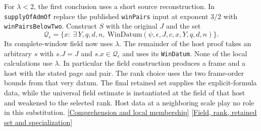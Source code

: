 \documentclass[12pt,letterpaper]{article}
\begin{document}
For \(\lambda<2\), the first conclusion uses a short source reconstruction. In \texttt{supplyOfAdmOf} replace the published \texttt{winPairs} input at exponent \(3/2\) with \texttt{winPairsBelowTwo}. Construct \(S\) with the original \(J\) and the set
\begin{equation}
 \mathcal Q_\epsilon=\{x:\ \exists\,Y,q,d,n,\ 
             \mathrm{WinDatum}(\psi,\epsilon,J,c,x,Y,q,d,n)\}.
 \label{eq:transport-qual}
\end{equation}
Its complete-window field now uses \(\lambda\). The remainder of the host proof takes an arbitrary \(s\) with \(s.J=J\) and \(s.x\in\mathcal Q_\epsilon\) and uses its \texttt{WinDatum}. None of the local calculations use \(\lambda\). In particular the field construction produces a frame and a host with the stated page and pair. The rank choice uses the two frame-order bounds from that very datum. The final retained set supplies the explicit-formula data, while the universal field estimate is instantiated at the field of that host and weakened to the selected rank. Host data at a neighboring scale play no role in this substitution.
\href{https://github.com/nousentllc/riemann-hypothesis/blob/40e56bab026552e089d7afcfeff08d2defb9c005/src/Development/AutomorphicArithmetic/ShortNorms/supplyOfAdmOf.lean#L48-L63}{[Comprehension and local membership]}
\href{https://github.com/nousentllc/riemann-hypothesis/blob/40e56bab026552e089d7afcfeff08d2defb9c005/src/Development/AutomorphicArithmetic/ShortNorms/supplyOfAdmOf.lean#L93-L135}{[Field, rank, retained set and specialization]}
\end{document}
